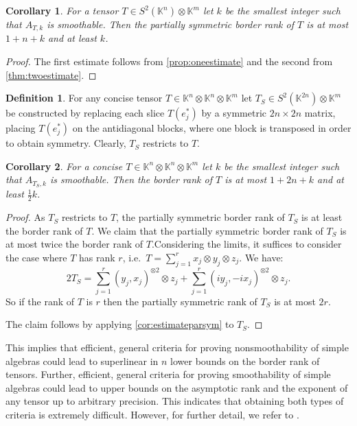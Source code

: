 \documentclass[a4paper,11pt,reqno]{amsart}
\newcommand{\bbK}{\mathbb{K}}
\renewcommand{\tilde}[1]{\widetilde{#1}}
\numberwithin{equation}{section}
\theoremstyle{definition}
\newtheorem{defn}[equation]{Definition}
\theoremstyle{plain}
\newtheorem{cor}[defn]{Corollary}
\theoremstyle{remark}
\begin{document}
\begin{cor}\label{cor:estimateparsym}
For a tensor $T\in S^2(\bbK^n)\otimes \bbK^m$ let $k$ be the smallest integer
{such} that $A_{T,k}$ is smoothable. Then the partially symmetric border rank of
$T$ is at most $1+n+k$ and at least $k$.
\end{cor}
\begin{proof}
The first estimate follows from \autoref{prop:oneestimate} and the second from \autoref{thm:twoestimate}.
\end{proof}
\begin{defn}
For any concise tensor $T\in \bbK^n\otimes \bbK^n\otimes \bbK^m$ let $T_S\in S^2(\bbK^{2n})\otimes \bbK^m$ be constructed by
replacing each slice $T(e_j^*)$ by a symmetric $2n\times 2n$ matrix, {placing}
$T(e_j^*)$ on the antidiagonal blocks, {where one block is transposed in order
to obtain symmetry.} Clearly, $T_S$ restricts to $T$.
\end{defn}


\begin{cor}\label{cor:smoothabilitybrank1}
For a concise $T\in \bbK^n\otimes \bbK^n\otimes \bbK^m$ let $k$ be the smallest integer {such} that $A_{T_S,k}$ is smoothable. Then the border rank of $T$ is at most $1+2n+k$ and at least $\frac{1}{2}k$.
\end{cor}
\begin{proof}
As $T_S$ restricts to $T$, the
partially symmetric border rank of $T_S$ is at least the border rank of $T$.
We claim that the partially symmetric border rank of $T_S$ is at most twice the border rank of $T$.{Considering the limits, it suffices to consider the case where} $T$ has rank $r$, i.e.~$T=\sum_{j=1}^r x_j\otimes y_j\otimes z_j$. We have:
\[2T_S=\sum_{j=1}^r (y_j,x_j)^{\otimes 2}\otimes z_j+\sum_{j=1}^r (iy_j,-ix_j)^{\otimes 2}\otimes z_j.\]
{So if the} rank of $T$ is $r$ {then the} partially symmetric rank of $T_S$ is at most $2r$.

The claim follows by applying \autoref{cor:estimateparsym} to $T_S$.
\end{proof}
This implies that efficient, general criteria for proving nonsmoothability of simple algebras could lead to superlinear in $n$ lower bounds on {the border rank} of tensors. Further, efficient, general criteria {for proving} smoothability of simple algebras could lead to {upper bounds on the asymptotic rank} and the exponent \cite{kaski2024universal} of {any} tensor up to arbitrary precision. {This indicates that obtaining both types of criteria is extremely difficult. However, for further detail, we refer to \cite{Jel19}.}
\end{document}
